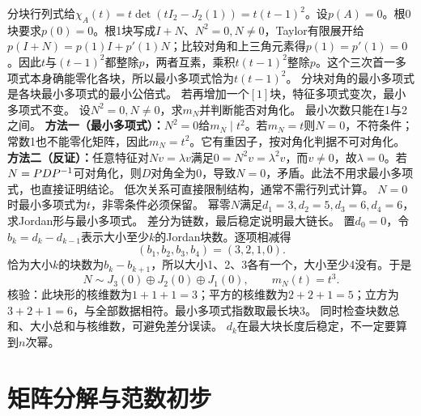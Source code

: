 {分块行列式给$\chi_A(t)=t\det(tI_2-J_2(1))=t(t-1)^2$。设$p(A)=0$。根0块要求$p(0)=0$。根1块写成$I+N$、$N^2=0,N\ne0$，Taylor有限展开给$p(I+N)=p(1)I+p'(1)N$；比较对角和上三角元素得$p(1)=p'(1)=0$。因此$t$与$(t-1)^2$都整除$p$，两者互素，乘积$t(t-1)^2$整除$p$。这个三次首一多项式本身确能零化各块，所以最小多项式恰为$t(t-1)^2$。}
{分块对角的最小多项式是各块最小多项式的最小公倍式。}
{若再增加一个$[1]$块，特征多项式变次，最小多项式不变。}
{设$N^2=0,N\ne0$，求$m_N$并判断能否对角化。}
{最小次数只能在1与2之间。}
{\textbf{方法一（最小多项式）：}$N^2=0$给$m_N\mid t^2$。若$m_N=t$则$N=0$，不符条件；常数1也不能零化矩阵，因此$m_N=t^2$。它有重因子，按对角化判据不可对角化。
\textbf{方法二（反证）：}任意特征对$Nv=\lambda v$满足$0=N^2v=\lambda^2v$，而$v\ne0$，故$\lambda=0$。若$N=PDP^{-1}$可对角化，则$D$对角全为0，导致$N=0$，矛盾。此法不用求最小多项式，也直接证明结论。}
{低次关系可直接限制结构，通常不需行列式计算。}
{$N=0$时最小多项式为$t$，非零条件必须保留。}
{幂零$N$满足$d_1=3,d_2=5,d_3=6,d_4=6$，求Jordan形与最小多项式。}
{差分为链数，最后稳定说明最大链长。}
{置$d_0=0$，令$b_k=d_k-d_{k-1}$表示大小至少$k$的Jordan块数。逐项相减得
\[(b_1,b_2,b_3,b_4)=(3,2,1,0).\]
恰为大小$k$的块数为$b_k-b_{k+1}$，所以大小1、2、3各有一个，大小至少4没有。于是
\[N\sim J_3(0)\oplus J_2(0)\oplus J_1(0),\qquad m_N(t)=t^3.\]
核验：此块形的核维数为$1+1+1=3$；平方的核维数为$2+2+1=5$；立方为$3+2+1=6$，与全部数据相符。最小多项式指数取最长块3。}
{同时检查块数总和、大小总和与核维数，可避免差分误读。}
{$d_k$在最大块长度后稳定，不一定要算到$n$次幂。}
\section{矩阵分解与范数初步}
